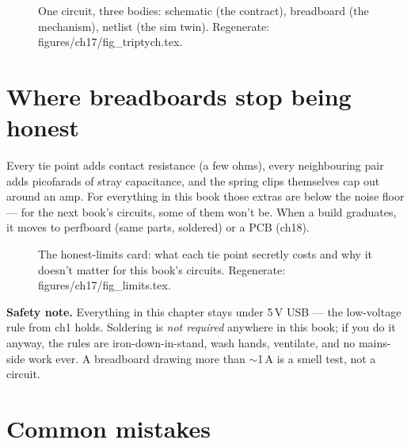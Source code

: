 \begin{figure}[htbp]
\centering

\caption{One circuit, three bodies: schematic (the contract),
breadboard (the mechanism), netlist (the sim twin). Regenerate:
\ttfamily figures/ch17/fig\_triptych.tex.}
\label{fig:triptych17}
\end{figure}

\section{Where breadboards stop being honest}\label{sec:limits17}

Every tie point adds contact resistance (a few ohms), every
neighbouring pair adds picofarads of stray capacitance, and the
spring clips themselves cap out around an amp. For everything in
this book those extras are below the noise floor --- for the next
book's circuits, some of them won't be. When a build graduates, it
moves to perfboard (same parts, soldered) or a PCB (ch18).

\begin{figure}[htbp]
\centering

\caption{The honest-limits card: what each tie point secretly costs
and why it doesn't matter for this book's circuits. Regenerate:
\ttfamily figures/ch17/fig\_limits.tex.}
\label{fig:limits17}
\end{figure}

\textbf{Safety note.} Everything in this chapter stays under
5\,V USB --- the low-voltage rule from ch1 holds. Soldering is
\emph{not required} anywhere in this book; if you do it anyway, the
rules are iron-down-in-stand, wash hands, ventilate, and no
mains-side work ever. A breadboard drawing more than $\sim$1\,A
is a smell test, not a circuit.

\section{Common mistakes}\label{sec:cm17}

